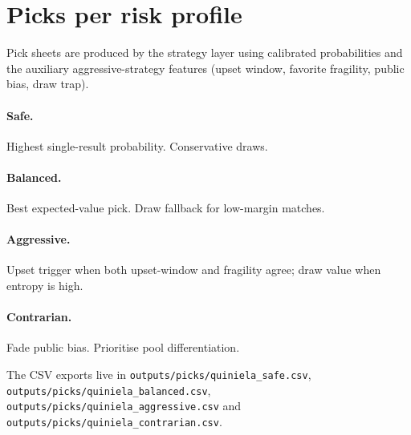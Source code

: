 \section*{Picks per risk profile}
Pick sheets are produced by the strategy layer using calibrated probabilities
and the auxiliary aggressive-strategy features (upset window, favorite
fragility, public bias, draw trap).

\paragraph{Safe.} Highest single-result probability. Conservative draws.
\paragraph{Balanced.} Best expected-value pick. Draw fallback for low-margin
matches.
\paragraph{Aggressive.} Upset trigger when both upset-window and fragility
agree; draw value when entropy is high.
\paragraph{Contrarian.} Fade public bias. Prioritise pool differentiation.

The CSV exports live in \texttt{outputs/picks/quiniela\_safe.csv},
\texttt{outputs/picks/quiniela\_balanced.csv},
\texttt{outputs/picks/quiniela\_aggressive.csv} and
\texttt{outputs/picks/quiniela\_contrarian.csv}.
